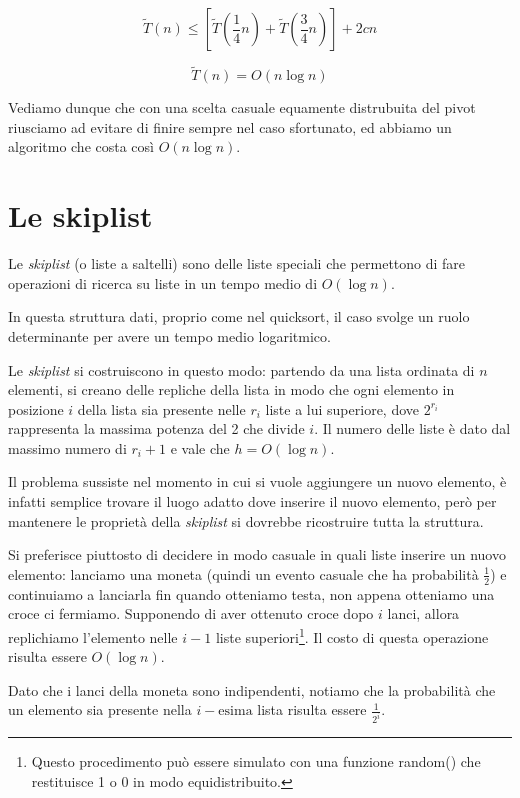 \documentclass[a4paper,11pt]{book}
\begin{document}
$$\tilde{T}(n) \leq \left[\tilde{T}\left(\frac{1}{4}n\right) + \tilde{T}\left(\frac{3}{4}n\right) \right] + 2cn$$

$$\tilde{T}(n) = O(n \log n)$$

Vediamo dunque che con una scelta casuale equamente distrubuita del pivot riusciamo ad evitare di finire sempre nel caso sfortunato, ed abbiamo un algoritmo che costa cos\`i  $O(n \log n)$.

\section{Le skiplist}

Le \emph{skiplist} (o liste a saltelli) sono delle liste speciali che permettono di fare operazioni di ricerca su liste in un tempo medio di $O(\log n)$.

In questa struttura dati, proprio come nel quicksort, il caso svolge un ruolo determinante per avere un tempo medio logaritmico.

Le \emph{skiplist} si costruiscono in questo modo: partendo da una lista ordinata di $n$ elementi, si creano delle repliche della lista in modo che ogni elemento in posizione $i$ della lista sia presente nelle $r_i$ liste a lui superiore, dove $2^{r_i}$ rappresenta la massima potenza del 2 che divide $i$. Il numero delle liste \`e dato dal massimo numero di $r_i+1$ e vale che $h = O(\log n)$.

Il problema sussiste nel momento in cui si vuole aggiungere un nuovo elemento, \`e infatti semplice trovare il luogo adatto dove inserire il nuovo elemento, per\`o per mantenere le propriet\`a della \emph{skiplist} si dovrebbe ricostruire tutta la struttura.

Si preferisce piuttosto di decidere in modo casuale in quali liste inserire un nuovo elemento: lanciamo una moneta (quindi un evento casuale che ha probabilit\`a $\frac{1}{2}$) e continuiamo a lanciarla fin quando otteniamo testa, non appena otteniamo una croce ci fermiamo. Supponendo di aver ottenuto croce dopo $i$ lanci, allora replichiamo l'elemento nelle $i-1$ liste superiori\footnote{Questo procedimento pu\`o essere simulato con una funzione \textsf{random()} che restituisce 1 o 0 in modo equidistribuito.}. Il costo di questa operazione risulta essere $O(\log n)$.

Dato che i lanci della moneta sono indipendenti, notiamo che la probabilit\`a che un elemento sia presente nella $i-\mbox{esima}$ lista risulta essere $\frac{1}{2^i}$.
\end{document}
